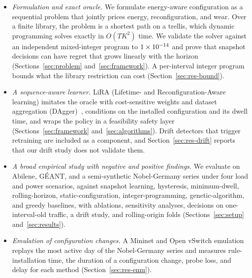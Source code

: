 \documentclass[journal]{IEEEtran}
\begin{document}
\begin{itemize}
\item \emph{Formulation and exact oracle.} We formulate energy-aware configuration as a sequential problem that jointly prices energy, reconfiguration, and wear. Over a finite library, the problem is a shortest path on a trellis, which dynamic programming solves exactly in $O(TK^2)$ time. We validate the solver against an independent mixed-integer program to $1\times10^{-14}$ and prove that snapshot decisions can have regret that grows linearly with the horizon (Sections~\ref{sec:problem} and~\ref{sec:framework}). A per-interval integer program bounds what the library restriction can cost (Section~\ref{sec:res-bound}).
\item \emph{A sequence-aware learner.} LiRA (Lifetime- and Reconfiguration-Aware learning) imitates the oracle with cost-sensitive weights and dataset aggregation (DAgger)~\cite{ross2011dagger}, conditions on the installed configuration and its dwell time, and wraps the policy in a feasibility safety layer (Sections~\ref{sec:framework} and~\ref{sec:algorithms}). Drift detectors that trigger retraining are included as a component, and Section~\ref{sec:res-drift} reports that our drift study does not validate them.
\item \emph{A broad empirical study with negative and positive findings.} We evaluate on Abilene, G\'{E}ANT, and a semi-synthetic Nobel-Germany series under four load and power scenarios, against snapshot learning, hysteresis, minimum-dwell, rolling-horizon, static-configuration, integer-programming, genetic-algorithm, and greedy baselines, with ablations, sensitivity analyses, decisions on one-interval-old traffic, a drift study, and rolling-origin folds (Sections~\ref{sec:setup} and~\ref{sec:results}).
\item \emph{Emulation of configuration changes.} A Mininet and Open vSwitch emulation replays the most active day of the Nobel-Germany series and measures rule-installation time, the duration of a configuration change, probe loss, and delay for each method (Section~\ref{sec:res-emu}).
\end{itemize}
\end{document}

